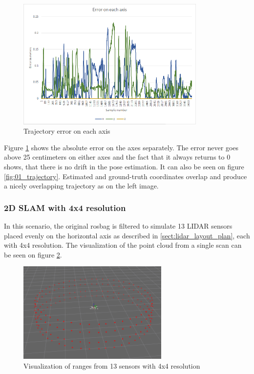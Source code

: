 \begin{figure}[!h]
    \centering
	\includegraphics[height=65mm, keepaspectratio]{figures/01_trajectory_error.png}
    \caption{Trajectory error on each axis}
    \label{fig:01_trajectory_error}
\end{figure}

Figure \ref{fig:01_trajectory_error} shows the absolute error on the axes separately. The error 
never goes above 25 centimeters on either axes and the fact that it always returns to 0 shows,
that there is no drift in the pose estimation. It can also be seen on figure 
\ref{fig:01_trajectory}. Estimated and ground-truth coordinates overlap and produce a nicely 
overlapping trajectory as on the left image.

\subsubsection{2D SLAM with 4x4 resolution}
In this scenario, the original rosbag is filtered to simulate 13 LIDAR sensors placed
evenly on the horizontal axis as described in \ref{sect:lidar_layout_plan}, each with
4x4 resolution. The visualization of the point cloud from a single scan can be seen on
figure \ref{fig:02_lidar_layout}. 

\begin{figure}[!h]
    \centering
	\includegraphics[height=50mm, keepaspectratio]{figures/02_lidar_layout.png}
    \caption{Visualization of ranges from 13 sensors with 4x4 resolution}
    \label{fig:02_lidar_layout}
\end{figure}

